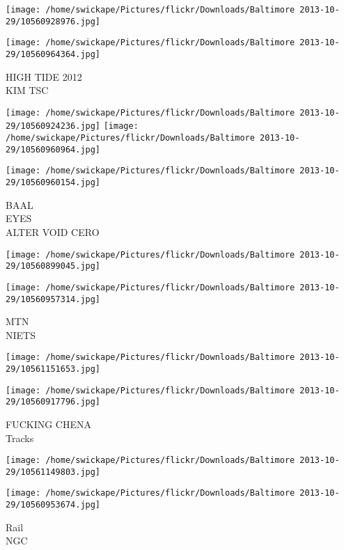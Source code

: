\documentclass[10pt,letterpaper]{article}
\begin{document}
\texttt{[image: /home/swickape/Pictures/flickr/Downloads/Baltimore 2013-10-29/10560928976.jpg]}

\vspace{0.25in}
\texttt{[image: /home/swickape/Pictures/flickr/Downloads/Baltimore 2013-10-29/10560964364.jpg]}

HIGH TIDE 2012\\
KIM TSC\\
\pagebreak

\texttt{[image: /home/swickape/Pictures/flickr/Downloads/Baltimore 2013-10-29/10560924236.jpg]}
\texttt{[image: /home/swickape/Pictures/flickr/Downloads/Baltimore 2013-10-29/10560960964.jpg]}

\texttt{[image: /home/swickape/Pictures/flickr/Downloads/Baltimore 2013-10-29/10560960154.jpg]}

BAAL\\
EYES\\
ALTER VOID CERO\\
\pagebreak

\texttt{[image: /home/swickape/Pictures/flickr/Downloads/Baltimore 2013-10-29/10560899045.jpg]}

\vspace{0.25in}
\texttt{[image: /home/swickape/Pictures/flickr/Downloads/Baltimore 2013-10-29/10560957314.jpg]}

MTN\\
NIETS\\
\pagebreak

\texttt{[image: /home/swickape/Pictures/flickr/Downloads/Baltimore 2013-10-29/10561151653.jpg]}

\vspace{0.25in}
\texttt{[image: /home/swickape/Pictures/flickr/Downloads/Baltimore 2013-10-29/10560917796.jpg]}

FUCKING CHENA\\
Tracks\\
\pagebreak

\texttt{[image: /home/swickape/Pictures/flickr/Downloads/Baltimore 2013-10-29/10561149803.jpg]}

\vspace{0.25in}
\texttt{[image: /home/swickape/Pictures/flickr/Downloads/Baltimore 2013-10-29/10560953674.jpg]}

Rail\\
NGC\\
\pagebreak
\end{document}
